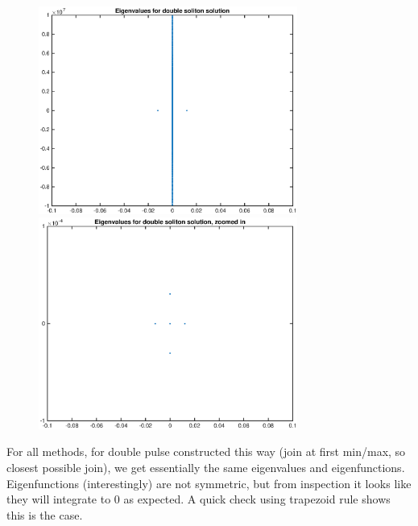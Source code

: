 \documentclass[12pt]{article}
\begin{document}
\begin{enumerate}
	\begin{figure}[H]
	\includegraphics[width=8.5cm]{double1_Four50_eig.eps}
	\includegraphics[width=8.5cm]{double1_Four50_zoom.eps}
	\end{figure}

\end{enumerate}

For all methods, for double pulse constructed this way (join at first min/max, so closest possible join), we get essentially the same eigenvalues and eigenfunctions. Eigenfunctions (interestingly) are not symmetric, but from inspection it looks like they will integrate to 0 as expected. A quick check using trapezoid rule shows this is the case.
\end{document}
